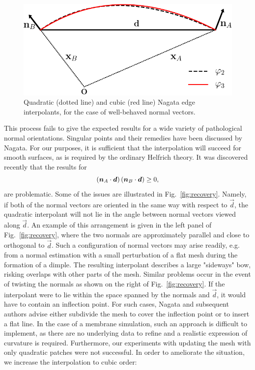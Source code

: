 \documentclass[twocolumn]{biophys-new}
\begin{document}
\begin{figure}[hbt]
\centering
\includegraphics[width=0.8\linewidth]{fig/equivalence-crop}
\caption{Quadratic (dotted line) and cubic (red line) Nagata edge interpolants, for the case of well-behaved normal vectors.}
\label{fig:nagata}
\end{figure}
This process fails to give the expected results for a wide variety of pathological normal orientations. Singular points and their remedies have been discussed by Nagata.\cite{NAGATA2005327} For our purposes, it is sufficient that the interpolation will succeed for smooth surfaces, as is required by the ordinary Helfrich theory. It was discovered recently that the results for 
\begin{equation}
  \left( \bm{n}_A \cdot \bm{d} \right)\left( \bm{n}_B \cdot \bm{d} \right) \geq 0,
  \label{eq:nagfail}
\end{equation}
are problematic.\cite{NETO2013639}  Some of the issues are illustrated in Fig.~\ref{fig:recovery}. Namely, if both of the normal vectors are oriented in the same way with respect to $\vec{d}$, the quadratic interpolant will not lie in the angle between normal vectors viewed along $\vec{d}$. An example of this arrangement is given in the left panel of Fig.~\ref{fig:recovery}, where the two normals are approximately parallel and close to orthogonal to $\vec{d}$. Such a configuration of normal vectors may arise readily, e.g. from a normal estimation with a small perturbation of a flat mesh during the formation of a dimple. The resulting interpolant describes a large "sideways" bow, risking overlaps with other parts of the mesh. Similar problems occur in the event of twisting the normals as shown on the right of Fig.~\ref{fig:recovery}. If the interpolant were to lie within the space spanned by the normals and $\vec{d}$, it would have to contain an inflection point. 
For such cases, Nagata and subsequent authors advise either subdivide the mesh to cover the inflection point or to insert a flat line. In the case of a membrane simulation, such an approach is difficult to implement, as there are no underlying data to refine and a realistic expression of curvature is required. Furthermore, our experiments with updating the mesh with only quadratic patches were not successful. In order to ameliorate the situation, we increase the interpolation to cubic order:
\end{document}
